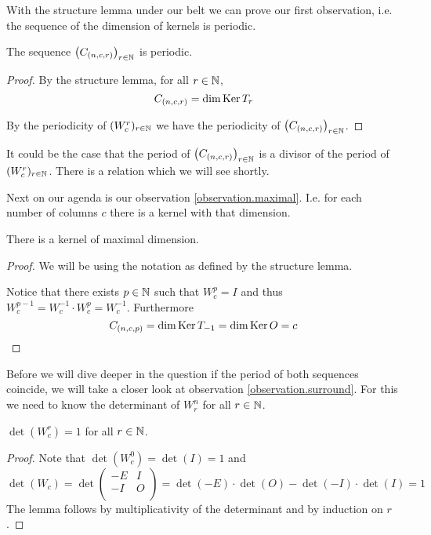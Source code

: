 With the structure lemma under our belt we can prove our first observation, i.e.
the sequence of the dimension of kernels is periodic.

\begin{proposition}
  The sequence $\left(C_{(n,c,r)}\right)_{r\in\mathbb{N}}$ is periodic.
\end{proposition}

\begin{proof}
  By the structure lemma, for all $r\in\mathbb{N}$,
  \[
  C_{(n,c,r)}
  =
  \dim\operatorname{Ker} T_{r}
  \]

  By the periodicity of $(W_{c}^{r})_{r\in\mathbb{N}}$ we have the
  periodicity of $\left(C_{(n,c,r)}\right)_{r\in\mathbb{N}}$.
\end{proof}

It could be the case that the period of $\left(C_{(n,c,r)}\right)_{r\in\mathbb{N}}$
is a divisor of the period of $(W_{c}^{r})_{r\in\mathbb{N}}$. There is a relation which 
we will see shortly.

Next on our agenda is our observation \ref{observation.maximal}. I.e. for each
number of columns $c$ there is a kernel with that dimension.

\begin{lemma}
  There is a kernel of maximal dimension.
\end{lemma}

\begin{proof}
  We will be using the notation as defined by the structure lemma.

  Notice that there exists $p\in\mathbb{N}$ such that $W_{c}^{p} = I$ and
  thus $W_{c}^{p-1} = W_{c}^{-1} \cdot W_{c}^{p} = W_{c}^{-1}$.
  Furthermore
  \[
  C_{(n,c,p)}
  =
  \dim\operatorname{Ker} T_{-1}
  =
  \dim\operatorname{Ker} O
  = c
  \]
\end{proof}

Before we will dive deeper in the question if the period of both sequences
coincide, we will take a closer look at observation \ref{observation.surround}.
For this we need to know the determinant of $W_{r}^{n}$ for all $r\in\mathbb{N}$.

\begin{lemma}
  $\det(W_{c}^{r}) = 1$ for all $r\in\mathbb{N}$.
\end{lemma}

\begin{proof}
  Note that $\det(W_{c}^{0}) = \det(I) = 1$ and
  \[
  \det(W_{c}) = \det
  \left(
  \begin{array}{cc}
    -E & I \\
    -I & O \\
  \end{array}
  \right)
  =
  \det(-E) \cdot \det(O) - \det(-I) \cdot \det(I)
  =
  1
  \]
  The lemma follows by multiplicativity of the determinant and
  by induction on $r$.
\end{proof}

